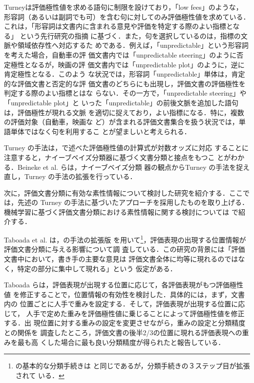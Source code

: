Turneyは評価極性値を求める語句に制限を設けており，「low fees」のような，
形容詞（あるいは副詞でも可）を含む句に対してのみ評価極性値を求めている．
これは，「形容詞は文書内に含まれる意見や評価を特定する際のよい指標となる」
\cite{hatzivassiloglou2000a,wiebe2000a,wiebe2001a} という先行研究の指摘
に基づく．また，句を選択しているのは，指標の文脈や領域依存性へ対応するた
めである．例えば，「unpredictable」という形容詞を考えた場合，自動車の評
価文書内では「unpredictable steering」のように否定極性となるが，映画の評
価文書内では「unpredictable plot」のように，逆に肯定極性となる．このよう
な状況では，形容詞「unpredictable」単体は，肯定的な評価文書と否定的な評
価文書のどちらにも出現し，評価文書の評価極性を判定する際のよい指標とはな
らない．その一方で，「unpredictable steering」や「unpredictable plot」と
いった「unpredictable」の前後文脈を追加した語句は，評価極性が現れる文脈
を適切に捉えており，よい指標になる．特に，複数の評価対象（自動車，映画な
ど）が含まれる評価文書集合を扱う状況では，単語単体ではなく句を利用するこ
とが望ましいと考えられる．

Turney の手法は，で述べた評価極性値の計算式が対数オッズに対応
することに注意すると，ナイーブベイズ分類器に基づく文書分類と接点をもつこ
とがわかる．Beineke et al. \cite{beineke2004a} らは，ナイーブベイズ分類
器の観点からTurney の手法を捉え直し，Turney の手法の拡張を行っている．

\vspace{1em}

次に，評価文書分類に有効な素性情報について検討した研究を紹介する．ここで
は，先述の Turney の手法に基づいたアプローチを採用したものを取り上げる．
機械学習に基づく評価文書分類における素性情報に関する検討については
で紹介する．

\vspace{1em}
\underline{\textbf{\cite{taboada2004a}}}
\vspace{1em}

Taboada et al. \cite{taboada2004a} は，\cite{turney2002a}の手法の拡張版
を用いて\footnote{ \cite{taboada2004a} の基本的な分類手続きは
\cite{turney2002a} と同じであるが，分類手続きの３ステップ目が拡張されて
いる．}，評価表現の出現する位置情報が評価文書分類に与える影響について調
査している．この研究の背景には「評価文書中において，書き手の主要な意見は
評価文書全体に均等に現れるのではなく，特定の部分に集中して現れる」という
仮定がある．

Taboada らは，評価表現が出現する位置に応じて，各評価表現がもつ評価極性値
を修正することで，位置情報の有効性を検討した．具体的には，まず，文書内の
位置ごとに人手で重みを設定する．そして，評価表現が出現する位置に応じて，
人手で定めた重みを評価極性値に乗じることによって評価極性値を修正する．出
現位置に対する重みの設定を変更させながら，重みの設定と分類精度との関係を
調査したところ，評価文書の後半2/3の位置に現れる評価表現への重みを最も高
くした場合に最も良い分類精度が得られたと報告している．

